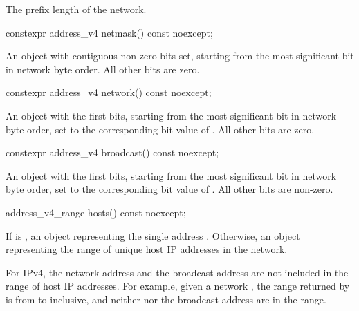 \begin{itemdescr}
\pnum
\returns The prefix length of the network.
\end{itemdescr}

\begin{itemdecl}
constexpr address_v4 netmask() const noexcept;
\end{itemdecl}

\begin{itemdescr}
\pnum
\returns An  object with  contiguous non-zero bits set, starting from the most significant bit in network byte order. All other bits are zero.
\end{itemdescr}

\begin{itemdecl}
constexpr address_v4 network() const noexcept;
\end{itemdecl}

\begin{itemdescr}
\pnum
\returns An  object with the first  bits, starting from the most significant bit in network byte order, set to the corresponding bit value of . All other bits are zero.
\end{itemdescr}

\begin{itemdecl}
constexpr address_v4 broadcast() const noexcept;
\end{itemdecl}

\begin{itemdescr}
\pnum
\returns An  object with the first  bits, starting from the most significant bit in network byte order, set to the corresponding bit value of . All other bits are non-zero.
\end{itemdescr}

\begin{itemdecl}
address_v4_range hosts() const noexcept;
\end{itemdecl}

\begin{itemdescr}
\pnum
\returns If  is , an  object representing the single address . Otherwise, an  object representing the range of unique host IP addresses in the network.

\pnum
\begin{note} For IPv4, the network address and the broadcast address are not included in the range of host IP addresses. For example, given a network , the range returned by  is from  to  inclusive, and neither  nor the broadcast address  are in the range. \end{note}
\end{itemdescr}

